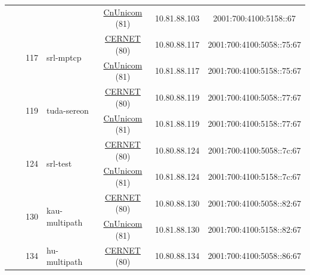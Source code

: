 \begin{small}
\begin{center}
\begin{longtable}{|c|c|c|c|c|c|c|c|}
  &  & \multicolumn{2}{|c|}{} & \multicolumn{2}{|c|}{\tiny{\href{http://www.chinaunicom.com}{CnUnicom} (81)}} & \tiny{10.81.88.103} & \tiny{2001:700:4100:5158::67} \\* \cline{3-3}\cline{4-4}\cline{5-5}\cline{6-6}\cline{7-7}\cline{8-8}
  &  & \multirow{2}{*}{\tiny{117}} & \multicolumn{1}{|l|}{\multirow{2}{*}{\tiny{srl-mptcp}}} & \multicolumn{2}{|c|}{\tiny{\href{http://www.cernet.edu.cn}{CERNET} (80)}} & \tiny{10.80.88.117} & \tiny{2001:700:4100:5058::75:67} \\* \cline{5-5}\cline{6-6}\cline{7-7}\cline{8-8}
  &  &  &  & \multicolumn{2}{|c|}{\tiny{\href{http://www.chinaunicom.com}{CnUnicom} (81)}} & \tiny{10.81.88.117} & \tiny{2001:700:4100:5158::75:67} \\* \cline{3-3}\cline{4-4}\cline{5-5}\cline{6-6}\cline{7-7}\cline{8-8}
  &  & \multirow{2}{*}{\tiny{119}} & \multicolumn{1}{|l|}{\multirow{2}{*}{\tiny{tuda-sereon}}} & \multicolumn{2}{|c|}{\tiny{\href{http://www.cernet.edu.cn}{CERNET} (80)}} & \tiny{10.80.88.119} & \tiny{2001:700:4100:5058::77:67} \\* \cline{5-5}\cline{6-6}\cline{7-7}\cline{8-8}
  &  &  &  & \multicolumn{2}{|c|}{\tiny{\href{http://www.chinaunicom.com}{CnUnicom} (81)}} & \tiny{10.81.88.119} & \tiny{2001:700:4100:5158::77:67} \\* \cline{3-3}\cline{4-4}\cline{5-5}\cline{6-6}\cline{7-7}\cline{8-8}
  &  & \multirow{2}{*}{\tiny{124}} & \multicolumn{1}{|l|}{\multirow{2}{*}{\tiny{srl-test}}} & \multicolumn{2}{|c|}{\tiny{\href{http://www.cernet.edu.cn}{CERNET} (80)}} & \tiny{10.80.88.124} & \tiny{2001:700:4100:5058::7c:67} \\* \cline{5-5}\cline{6-6}\cline{7-7}\cline{8-8}
  &  &  &  & \multicolumn{2}{|c|}{\tiny{\href{http://www.chinaunicom.com}{CnUnicom} (81)}} & \tiny{10.81.88.124} & \tiny{2001:700:4100:5158::7c:67} \\* \cline{3-3}\cline{4-4}\cline{5-5}\cline{6-6}\cline{7-7}\cline{8-8}
  &  & \multirow{2}{*}{\tiny{130}} & \multicolumn{1}{|l|}{\multirow{2}{*}{\tiny{kau-multipath}}} & \multicolumn{2}{|c|}{\tiny{\href{http://www.cernet.edu.cn}{CERNET} (80)}} & \tiny{10.80.88.130} & \tiny{2001:700:4100:5058::82:67} \\* \cline{5-5}\cline{6-6}\cline{7-7}\cline{8-8}
  &  &  &  & \multicolumn{2}{|c|}{\tiny{\href{http://www.chinaunicom.com}{CnUnicom} (81)}} & \tiny{10.81.88.130} & \tiny{2001:700:4100:5158::82:67} \\* \cline{3-3}\cline{4-4}\cline{5-5}\cline{6-6}\cline{7-7}\cline{8-8}
  &  & \multirow{2}{*}{\tiny{134}} & \multicolumn{1}{|l|}{\multirow{2}{*}{\tiny{hu-multipath}}} & \multicolumn{2}{|c|}{\tiny{\href{http://www.cernet.edu.cn}{CERNET} (80)}} & \tiny{10.80.88.134} & \tiny{2001:700:4100:5058::86:67} \\* \cline{5-5}\cline{6-6}\cline{7-7}\cline{8-8}

\end{longtable}
\end{center}
\end{small}

